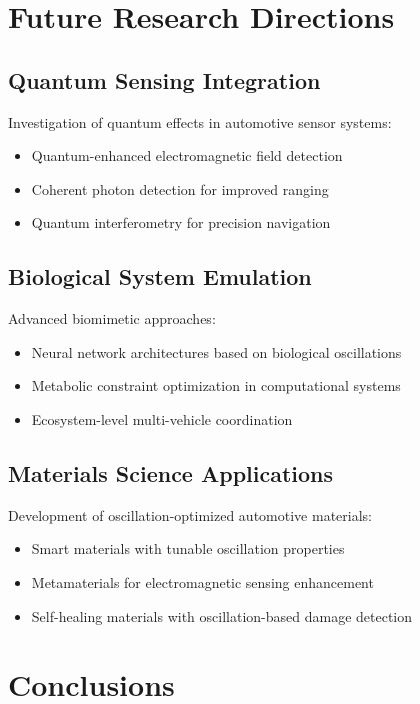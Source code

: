 \documentclass[11pt,a4paper]{article}
\begin{document}
\section{Future Research Directions}

\subsection{Quantum Sensing Integration}

Investigation of quantum effects in automotive sensor systems:
\begin{itemize}
    \item Quantum-enhanced electromagnetic field detection
    \item Coherent photon detection for improved ranging
    \item Quantum interferometry for precision navigation
\end{itemize}

\subsection{Biological System Emulation}

Advanced biomimetic approaches:
\begin{itemize}
    \item Neural network architectures based on biological oscillations
    \item Metabolic constraint optimization in computational systems
    \item Ecosystem-level multi-vehicle coordination
\end{itemize}

\subsection{Materials Science Applications}

Development of oscillation-optimized automotive materials:
\begin{itemize}
    \item Smart materials with tunable oscillation properties
    \item Metamaterials for electromagnetic sensing enhancement
    \item Self-healing materials with oscillation-based damage detection
\end{itemize}

\section{Conclusions}
\end{document}
